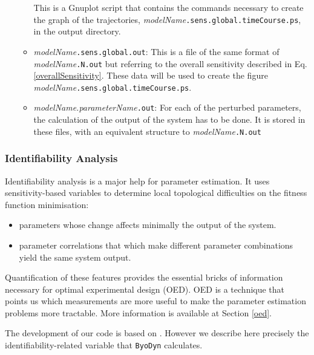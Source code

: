 \documentclass[a4paper, 11pt]{article}
\begin{document}
\begin{itemize}
\begin{itemize}
        This is a Gnuplot script that contains the commands necessary to create the graph of the trajectories, \textit{modelName}\texttt{.sens.global.timeCourse.ps}, in the output directory.
      \item \textit{modelName}\texttt{.sens.global.out}:
        This is a file of the same format of \textit{modelName}\texttt{.N.out} but referring to the overall sensitivity described in Eq. \ref{overallSensitivity}. 
        These data will be used to create the figure \textit{modelName}\texttt{.sens.global.timeCourse.ps}.
      \item \textit{modelName.parameterName}\texttt{.out}:
        For each of the perturbed parameters, the calculation of the output of the system has to be done. 
        It is stored in these files, with an equivalent structure to \textit{modelName}\texttt{.N.out}
    \end{itemize}
\end{itemize}
\subsubsection{Identifiability Analysis} \label{identifiability}
Identifiability analysis is a major help for parameter estimation. 
It uses sensitivity-based variables to determine local topological difficulties on the fitness function minimisation:
\begin{itemize}
  \item parameters whose change affects minimally the output of the system.
  \item parameter correlations that which make different parameter combinations yield the same system output.
\end{itemize}
Quantification of these features provides the essential bricks of information necessary for optimal experimental design (OED).
OED is a technique that points us which measurements are more useful to make the parameter estimation problems more tractable.
More information is available at Section \ref{oed}.

The development of our code is based on \cite{rodriguez-fernandez06,yue06}. 
However we describe here precisely the identifiability-related variable that \texttt{ByoDyn} calculates.
\end{document}
